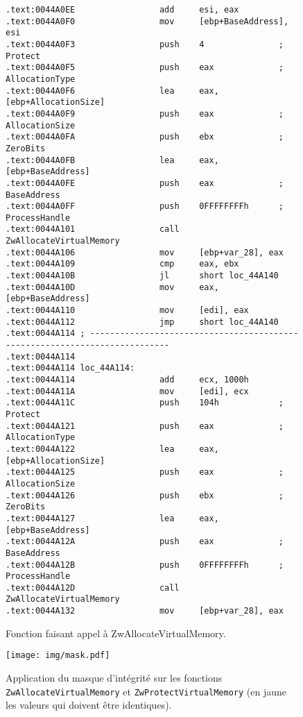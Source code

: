 \documentclass[times,11pt,fullpage]{article}
\begin{document}
\begin{figure}
\scriptsize
\begin{framed}
\begin{verbatim}
.text:0044A0EE                 add     esi, eax
.text:0044A0F0                 mov     [ebp+BaseAddress], esi
.text:0044A0F3                 push    4               ; Protect
.text:0044A0F5                 push    eax             ; AllocationType
.text:0044A0F6                 lea     eax, [ebp+AllocationSize]
.text:0044A0F9                 push    eax             ; AllocationSize
.text:0044A0FA                 push    ebx             ; ZeroBits
.text:0044A0FB                 lea     eax, [ebp+BaseAddress]
.text:0044A0FE                 push    eax             ; BaseAddress
.text:0044A0FF                 push    0FFFFFFFFh      ; ProcessHandle
.text:0044A101                 call    ZwAllocateVirtualMemory
.text:0044A106                 mov     [ebp+var_28], eax
.text:0044A109                 cmp     eax, ebx
.text:0044A10B                 jl      short loc_44A140
.text:0044A10D                 mov     eax, [ebp+BaseAddress]
.text:0044A110                 mov     [edi], eax
.text:0044A112                 jmp     short loc_44A140
.text:0044A114 ; ---------------------------------------------------------------------------
.text:0044A114
.text:0044A114 loc_44A114:                             
.text:0044A114                 add     ecx, 1000h
.text:0044A11A                 mov     [edi], ecx
.text:0044A11C                 push    104h            ; Protect
.text:0044A121                 push    eax             ; AllocationType
.text:0044A122                 lea     eax, [ebp+AllocationSize]
.text:0044A125                 push    eax             ; AllocationSize
.text:0044A126                 push    ebx             ; ZeroBits
.text:0044A127                 lea     eax, [ebp+BaseAddress]
.text:0044A12A                 push    eax             ; BaseAddress
.text:0044A12B                 push    0FFFFFFFFh      ; ProcessHandle
.text:0044A12D                 call    ZwAllocateVirtualMemory
.text:0044A132                 mov     [ebp+var_28], eax
\end{verbatim}
\end{framed}
\caption{Fonction faisant appel à ZwAllocateVirtualMemory.\label{fig:CallZwAlloc}}
\end{figure}


\begin{figure}
\begin{center}
 \texttt{[image: img/mask.pdf]}
\end{center}
\caption{Application du masque d'intégrité sur les fonctions \texttt{ZwAllocateVirtualMemory} et \texttt{ZwProtectVirtualMemory} (en jaune les valeurs qui doivent être identiques).}
\label{fig:matching}
\end{figure}
\end{document}
